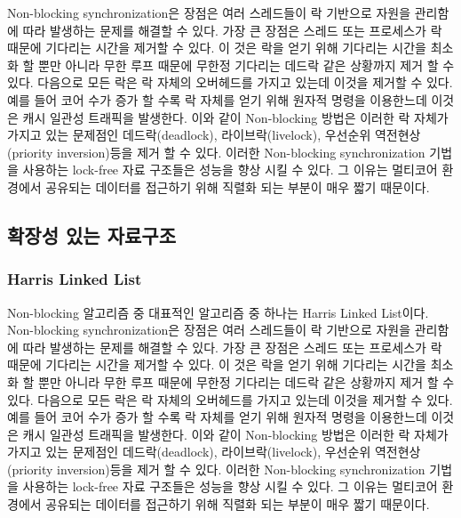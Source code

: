 Non-blocking synchronization은 장점은 여러 스레드들이 락 기반으로 자원을 관리함에 따라
 발생하는 문제를 해결할 수 있다. 
가장 큰 장점은 스레드 또는 프로세스가 락 때문에 기다리는 시간을 제거할 수 있다.
이 것은 락을 얻기 위해 기다리는 시간을 최소화 할 뿐만 아니라 무한 루프 때문에 무한정 기다리는 
데드락 같은 상황까지 제거 할 수 있다. 
다음으로 모든 락은 락 자체의 오버헤드를 가지고 있는데 이것을 제거할 수 있다. 
예를 들어 코어 수가 증가 할 수록 락 자체를 얻기 위해 원자적 명령을 이용한느데 이것은 캐시 일관성 트래픽을 
발생한다. 
이와 같이 Non-blocking 방법은 이러한 락 자체가 가지고 있는 문제점인 데드락(deadlock), 라이브락(livelock), 
우선순위 역전현상(priority inversion)등을 제거 할 수 있다. 
이러한 Non-blocking synchronization 기법을 사용하는 lock-free 자료 구조들은 성능을 향상 시킬 수 있다. 
그 이유는 멀티코어 환경에서 공유되는 데이터를 접근하기 위해 직렬화 되는 부분이 매우 짧기 때문이다. 



\subsection{확장성 있는 자료구조}

\subsubsection{Harris Linked List}


Non-blocking 알고리즘 중 대표적인 알고리즘 중 하나는 Harris Linked List이다. 
Non-blocking synchronization은 장점은 여러 스레드들이 락 기반으로 자원을 관리함에 따라
 발생하는 문제를 해결할 수 있다. 
가장 큰 장점은 스레드 또는 프로세스가 락 때문에 기다리는 시간을 제거할 수 있다.
이 것은 락을 얻기 위해 기다리는 시간을 최소화 할 뿐만 아니라 무한 루프 때문에 무한정 기다리는 
데드락 같은 상황까지 제거 할 수 있다. 
다음으로 모든 락은 락 자체의 오버헤드를 가지고 있는데 이것을 제거할 수 있다. 
예를 들어 코어 수가 증가 할 수록 락 자체를 얻기 위해 원자적 명령을 이용한느데 이것은 캐시 일관성 트래픽을 
발생한다. 
이와 같이 Non-blocking 방법은 이러한 락 자체가 가지고 있는 문제점인 데드락(deadlock), 라이브락(livelock), 
우선순위 역전현상(priority inversion)등을 제거 할 수 있다. 
이러한 Non-blocking synchronization 기법을 사용하는 lock-free 자료 구조들은 성능을 향상 시킬 수 있다. 
그 이유는 멀티코어 환경에서 공유되는 데이터를 접근하기 위해 직렬화 되는 부분이 매우 짧기 때문이다. 



